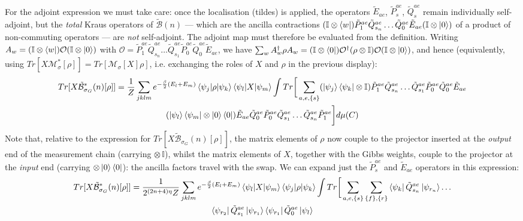 \documentclass[aps,floatfix,10pt,amssymb,amsfont,amsmath,superscriptaddress,float,nofootinbib,longbibliography,nobalancelastpage,twocolumn]{revtex4-2}
\begin{document}
\begin{widetext}
\begin{multline}
\end{multline}
For the adjoint expression we must take care: once the localisation (tildes) is applied, the operators $\tilde E_{ae}$, $\tilde P^{ae}_s$, $\tilde Q^{ae}_s$ remain individually self-adjoint, but the \emph{total} Kraus operators of $\tilde{\mathcal{B}}(n)$ --- which are the ancilla contractions $(\mathbb{I}\otimes\bra{w})\tilde P^{ae}_1\tilde Q^{ae}_{s_n}\ldots \tilde Q^{ae}_0\tilde E_{ae}(\mathbb{I}\otimes\ket{0})$ of a product of non-commuting operators --- are \emph{not} self-adjoint. The adjoint map must therefore be evaluated from the definition. Writing $A_w = (\mathbb{I}\otimes\bra{w})\mathcal{O}(\mathbb{I}\otimes\ket{0})$ with $\mathcal{O} = \tilde P^{ae}_1\tilde Q^{ae}_{s_n}\ldots \tilde Q^{ae}_{s_1}\tilde P^{ae}_0\tilde Q^{ae}_0\tilde E_{ae}$, we have $\sum_w A_w^{\dagger}\rho A_w = (\mathbb{I}\otimes\bra{0})\mathcal{O}^{\dagger}(\rho\otimes\mathbb{I})\mathcal{O}(\mathbb{I}\otimes\ket{0})$, and hence (equivalently, using $Tr[X\mathcal{M}^*_{\sigma}[\rho]] = Tr[\mathcal{M}_{\sigma}[X]\rho]$, i.e. exchanging the roles of $X$ and $\rho$ in the previous display):
\begin{multline}
    Tr[X\tilde{\mathcal{B}}^*_{\sigma_G}(n)[\rho]] = \frac{1}{Z}\sum_{jklm}e^{-\frac{\beta}{2}(E_l+E_m)}\braket{\psi_j|\rho|\psi_k}\braket{\psi_l|X|\psi_m}\int Tr\bigg[ \sum_{a,e,\{s\}}(\ket{\psi_j}\bra{\psi_k}\otimes \mathbb{I})\tilde P^{ae}_1\tilde Q^{ae}_{s_n}\ldots \tilde Q^{ae}_{s_1}\tilde P^{ae}_0\tilde Q^{ae}_0\tilde E_{ae} \\(\ket{\psi_l}\bra{\psi_m}\otimes \ket{0}\bra{0})  \tilde E_{ae}\tilde Q^{ae}_0\tilde P^{ae}_0\tilde Q^{ae}_{s_1}\ldots \tilde Q^{ae}_{s_n}\tilde P^{ae}_1\bigg]d\mu(C)
    \label{eq:Bstarexpanded}
\end{multline}
Note that, relative to the expression for $Tr[X\tilde{\mathcal{B}}_{\sigma_G}(n)[\rho]]$, the matrix elements of $\rho$ now couple to the projector inserted at the \emph{output} end of the measurement chain (carrying $\otimes\,\mathbb{I}$), whilst the matrix elements of $X$, together with the Gibbs weights, couple to the projector at the \emph{input} end (carrying $\otimes\ket{0}\bra{0}$): the ancilla factors travel with the swap. We can expand just the $\tilde P_s^{ae}$ and $\tilde E_{ae}$ operators in this expression:
\begin{multline}
    Tr[X\tilde{\mathcal{B}}^*_{\sigma_G}(n)[\rho]] = \frac{1}{2^{(2n+4)\eta}Z}\sum_{jklm}e^{-\frac{\beta}{2}(E_l+E_m)}\braket{\psi_l|X|\psi_m}\braket{\psi_j|\rho|\psi_k}\int Tr\bigg[ \sum_{a,e,\{s\}}\sum_{\{f\}, \{r\}}\bra{\psi_k}\tilde Q^{ae}_{s_n}\ket{\psi_{r_{n}}}\ldots \\\bra{\psi_{r_2}}\tilde Q^{ae}_{s_1}\ket{\psi_{r_1}}\bra{\psi_{r_1}}\tilde Q^{ae}_0\ket{\psi_l}

\end{multline}
\end{widetext}
\end{document}
